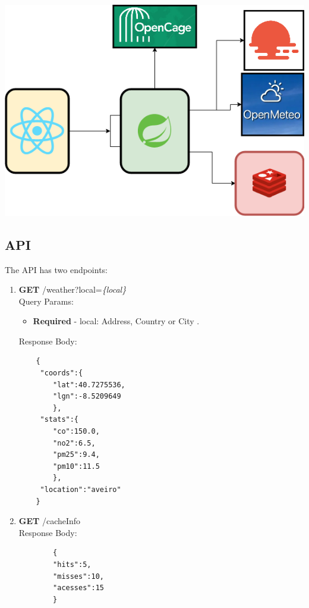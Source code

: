 \documentclass[12pt]{article}
\begin{document}
\includegraphics[scale=.4]{TechFrameworks.png}



\subsection{API}

The API has two endpoints:

\begin{enumerate}
	
	\item \textbf{GET} /weather?local=\textit{\{local\}} \\
	Query Params: 
	\begin{itemize}
			\item \textbf{Required} - local: Address, Country or City .
	\end{itemize}
		
	
	Response Body: \\ 
	\begin{lstlisting}
	{
	 "coords":{
	 	"lat":40.7275536,
	 	"lgn":-8.5209649
	 	},
	 "stats":{
	 	"co":150.0,
	 	"no2":6.5,
	 	"pm25":9.4,
	 	"pm10":11.5
	 	},
	 "location":"aveiro"
	}
	\end{lstlisting}
	
	
	\item \textbf{GET} /cacheInfo\\
	Response Body: \\
	\begin{lstlisting}
		{
		"hits":5,
		"misses":10,
		"acesses":15
		}
		
	\end{lstlisting}

\end{enumerate}
\end{document}
